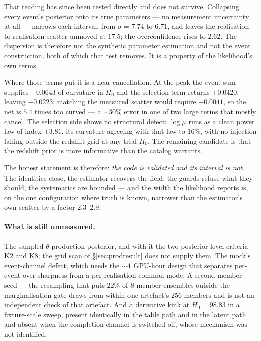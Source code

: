 \documentclass[11pt]{article}
\theoremstyle{definition}
\theoremstyle{remark}
\begin{document}
That reading has since been tested directly and does not survive. Collapsing
every event's posterior onto its true parameters --- no measurement uncertainty
at all --- narrows each interval, from $\sigma=7.74$ to $6.71$, and leaves the
realisation-to-realisation scatter unmoved at $17.5$; the overconfidence rises
to $2.62$. The dispersion is therefore not the synthetic parameter estimation
and not the event construction, both of which that test removes. It is a
property of the likelihood's own terms.

Where those terms put it is a near-cancellation. At the peak the event sum
supplies $-0.0643$ of curvature in $H_0$ and the selection term returns
$+0.0420$, leaving $-0.0223$; matching the measured scatter would require
$-0.0041$, so the net is $5.4$ times too curved --- a $\sim30\%$ error in one
of two large terms that mostly cancel. The selection side shows no structural
defect: $\log\mu$ runs as a clean power law of index $+3.81$, its curvature
agreeing with that law to $16\%$, with no injection falling outside the
redshift grid at any trial $H_0$. The remaining candidate is that the redshift
prior is more informative than the catalog warrants.

The honest statement is therefore: \emph{the code is validated and its
interval is not}. The identities close, the estimator recovers the field, the
guards refuse what they should, the systematics are bounded --- and the width
the likelihood reports is, on the one configuration where truth is known,
narrower than the estimator's own scatter by a factor $2.3$--$2.9$.

\paragraph{What is still unmeasured.} The sampled-$\theta$ production
posterior, and with it the two posterior-level criteria K2 and K8; the grid scan
of \S\ref{sec:prodresult} does not supply them. The mock's event-channel defect,
which needs the $\sim4$ GPU-hour design that separates per-event over-sharpness
from a per-realisation common mode. A second member seed --- the resampling that
puts $22\%$ of $8$-member ensembles outside the marginalisation gate draws from
within one artefact's $256$ members and is not an independent check of that
artefact. And a derivative kink at $H_0=98.83$ in a fixture-scale sweep, present
identically in the table path and in the latent path and absent when the
completion channel is switched off, whose mechanism was not identified.
\end{document}
